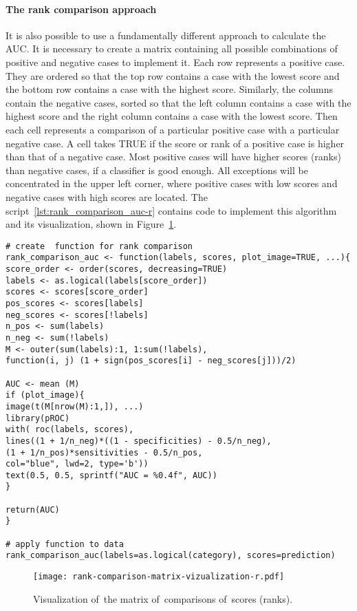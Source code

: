 \documentclass[]{scrreprt}
\begin{document}
\paragraph{The rank comparison approach}
It is also possible to use a fundamentally different approach to calculate the AUC. It is necessary to create a matrix containing all possible combinations of positive and negative cases to implement it. Each row represents a positive case. They are ordered so that the top row contains a case with the lowest score and the bottom row contains a case with the highest score. Similarly, the columns contain the negative cases, sorted so that the left column contains a case with the highest score and the right column contains a case with the lowest score. Then each cell represents a comparison of a particular positive case with a particular negative case. A cell takes TRUE if the score or rank of a positive case is higher than that of a negative case. Most positive cases will have higher scores (ranks) than negative cases, if a classifier is good enough. All exceptions will be concentrated in the upper left corner, where positive cases with low scores and negative cases with high scores are located. The script~\ref{lst:rank_comparison_auc-r} contains code to implement this algorithm and its visualization, shown in Figure~\ref{fig:rank-comparison-matrix-vizualization-r}.
%
\begin{lstlisting}[float=htp, caption = Create the function to~build a~comparison matrix and apply it to~the test data, firstnumber=1, label= lst:rank_comparison_auc-r]
# create  function for rank comparison
rank_comparison_auc <- function(labels, scores, plot_image=TRUE, ...){
score_order <- order(scores, decreasing=TRUE)
labels <- as.logical(labels[score_order])
scores <- scores[score_order]
pos_scores <- scores[labels]
neg_scores <- scores[!labels]
n_pos <- sum(labels)
n_neg <- sum(!labels)
M <- outer(sum(labels):1, 1:sum(!labels), 
function(i, j) (1 + sign(pos_scores[i] - neg_scores[j]))/2)

AUC <- mean (M)
if (plot_image){
image(t(M[nrow(M):1,]), ...)
library(pROC)
with( roc(labels, scores),
lines((1 + 1/n_neg)*((1 - specificities) - 0.5/n_neg), 
(1 + 1/n_pos)*sensitivities - 0.5/n_pos, 
col="blue", lwd=2, type='b'))
text(0.5, 0.5, sprintf("AUC = %0.4f", AUC))
}

return(AUC)
}

# apply function to data
rank_comparison_auc(labels=as.logical(category), scores=prediction)
\end{lstlisting}
%
\begin{figure}[htp]
	\centering
	\texttt{[image: rank-comparison-matrix-vizualization-r.pdf]}
	\caption{Visualization of~the matrix of~comparisons of~scores (ranks).}
	\label{fig:rank-comparison-matrix-vizualization-r}
\end{figure}
%
\end{document}
